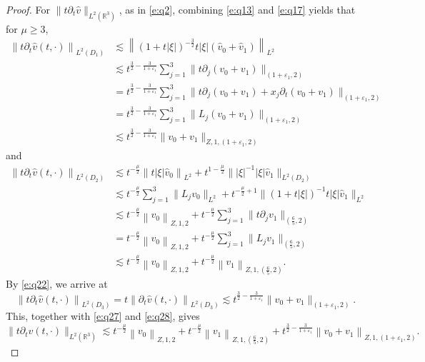 \documentclass[11pt,twoside]{article}
\newcommand{\R}{\mathbb R}
\newcommand{\p}{\partial}
\newcommand{\f}{\frac}
\theoremstyle{plain}
\theoremstyle{definition}
\theoremstyle{remark}
\numberwithin{equation}{section}
\begin{document}
\begin{proof}
For $\|t\p_t\hat{v}\|_{L^2(\R^3)}$, as in \eqref{e:q2}, combining \eqref{e:q13} and \eqref{e:q17} yields that for $\mu\geq3$,
\begin{equation}\label{e:q27}
\begin{aligned}
\left\|t\p_t\hat{v}(t, \cdot)\right\|_{L^2(D_1)}  &\lesssim\left\|(1+t|\xi|)^{-\f32}t|\xi|(\hat{v}_{0}+\hat{v}_{1})\right\|_{L^{2}}\\
& \lesssim t^{\f32-\f{3}{1+\varepsilon_1}}\sum_{j=1}^{3}\|t\p_j(v_0+v_1)\|_{(1+\varepsilon_1, 2)}\\
& = t^{\f32-\f{3}{1+\varepsilon_1}}\sum_{j=1}^{3}\|t\p_j(v_0+v_1)+x_j\p_t(v_0+v_1)\|_{(1+\varepsilon_1, 2)}\\
& = t^{\f32-\f{3}{1+\varepsilon_1}}\sum_{j=1}^{3}\|L_j(v_0+v_1)\|_{(1+\varepsilon_1, 2)}\\
& \lesssim t^{\f32-\f{3}{1+\varepsilon_1}}\|v_0+v_1\|_{Z,1, (1+\varepsilon_1, 2)}
\end{aligned}
\end{equation}
and
\begin{equation}\label{e:q28}
\begin{aligned}
\left\|t\p_t\hat{v}(t, \cdot)\right\|_{L^2(D_2)}
& \lesssim t^{-\frac{\mu}{2}}\left\|t|\xi|\hat{v}_{0}\right\|_{L^{2}}+t^{1-\f{\mu}{2}} \||\xi|^{-1}|\xi|\hat{v}_{1}\|_{L^{2}(D_2)}\\
& \lesssim t^{-\frac{\mu}{2}}\sum_{j=1}^{3}\|L_jv_0\|_{L^2}+t^{-\frac{\mu}{2}+1} \|(1+t|\xi|)^{-1}t|\xi|\hat{v}_{1}\|_{L^{2}}\\
& \lesssim t^{-\frac{\mu}{2}}\left\|v_{0}\right\|_{Z, 1, 2}+ t^{-\frac{\mu}{2}}\sum_{j=1}^{3}\|t\p_jv_1\|_{(\f65, 2)} \\
&=t^{-\frac{\mu}{2}}\left\|v_{0}\right\|_{Z, 1, 2}+ t^{-\frac{\mu}{2}}\sum_{j=1}^{3}\|L_jv_1\|_{(\f65, 2)}\\
& \lesssim  t^{-\frac{\mu}{2}}\left\|v_{0}\right\|_{Z, 1, 2}+ t^{-\frac{\mu}{2}}\left\|v_1\right\|_{Z, 1,(\f65, 2)}.
\end{aligned}
\end{equation}
By \eqref{e:q22}, we arrive at
\begin{equation}\label{e:q29}
\left\|t\p_t\hat{v}(t, \cdot)\right\|_{L^2(D_3)}=t\left\|\p_t\hat{v}(t, \cdot)\right\|_{L^2(D_3)} \lesssim t^{\f32-\f{3}{1+\varepsilon_1}}\|v_0+v_1\|_{(1+\varepsilon_1, 2)}.
\end{equation}
This, together with \eqref{e:q27} and \eqref{e:q28}, gives
\begin{equation}\label{e:q30}
\|t\p_tv(t, \cdot)\|_{L^2(\R^3)} \lesssim t^{-\f{\mu}{2}}\left\|v_0\right\|_{Z, 1, 2}+t^{-\f{\mu}{2}}\left\|v_1\right\|_{Z, 1,(\f65, 2)}+t^{\f32-\f{3}{1+\varepsilon_1}}\left\|v_0+v_1\right\|_{Z, 1,(1+\varepsilon_1, 2)}.
\end{equation}



\end{proof}
\end{document}
